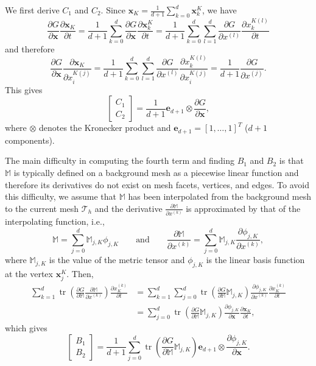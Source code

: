 \documentclass[american]{scrartcl}
\providecommand{\V}[1]{\boldsymbol{#1}}
\providecommand{\p}[2]{\frac{\partial{}#1}{\partial{}#2}}
\providecommand{\Th}{\mathcal{T}_h}
\providecommand{\M}{\mathbb{M}}
\theoremstyle{remark}
\begin{document}
We first derive $C_1$ and $C_2$. 
Since $\V{x}_K = \frac{1}{d+1} \sum\limits_{k=0}^d \V{x}_{k}^K$, we have
\[
   \p{G}{\V{x}} \p{\V{x}_K}{t} 
      = \frac{1}{d+1} \sum_{k=0}^d \p{G}{\V{x}} \p{\V{x}_{k}^K}{t}
      = \frac{1}{d+1} \sum_{k=0}^d \sum_{l=1}^d 
         \p{G}{x^{(l)}} \p{x_{k}^{K (l)}}{t}
\]
and therefore
\[
   \p{G}{\V{x}} \p{\V{x}_K}{x_{i}^{K (j)}}  
      = \frac{1}{d+1} \sum_{k=0}^d \sum_{l=1}^d \p{G}{x^{(l)}}
         \p{x_{k}^{K (l)}}{x_{i}^{K (j)}}
      = \frac{1}{d+1} \p{G}{x^{(j)}}
   .
\]
This gives
\begin{equation}
   \begin{bmatrix} C_1 \\ C_2 \end{bmatrix}  
      =  \frac{1}{d+1} \V{e}_{d+1} \otimes  \p{G}{\V{x}}
   ,
   \label{eq:x:der:4}
\end{equation}
where $\otimes$ denotes the Kronecker product and $\V{e}_{d+1} = {[1,\dotsc,1]}^T$ ($d+1$ components).

The main difficulty in computing the fourth term and finding $B_1$ and $B_2$ is that $\M$ is typically defined on a background mesh as a piecewise linear function and therefore its derivatives do not exist on mesh facets, vertices, and edges.
To avoid this difficulty, we assume that $\M$ has been interpolated from the background mesh to the current mesh $\Th$ and the derivative $\p{\M}{x^{(k)}}$ is approximated by that of the interpolating function, i.e., 
\[
   \M = \sum_{j=0}^d \M_{j,K} \phi_{j, K}
   \qquad \text{and} \qquad
   \p{\M}{x^{(k)}} = \sum_{j=0}^d \M_{j,K} \p{\phi_{j,K}}{x^{(k)}}
   ,
\]
where $\M_{j,K}$ is the value of the metric tensor and $\phi_{j,K}$ is the linear basis function at the vertex $\V{x}_{j}^K$.
Then,
\begin{align*}
   \sum_{k=1}^d \operatorname{tr}\left( \p{G}{\M} \p{\M}{x^{(k)}} \right) \p{x_K^{(k)}}{t}
      &= \sum_{k=1}^d \sum_{j=0}^d \operatorname{tr}\left( \p{G}{\M} \M_{j,K} \right)
      \p{\phi_{j,K}}{x^{(k)}} \p{x_K^{(k)}}{t}
   \\
      &=  \sum_{j=0}^d \operatorname{tr}\left( \p{G}{\M} \M_{j,K} \right)  
         \p{\phi_{j,K}}{\V{x}} \p{\V{x}_K}{t}
   ,
\end{align*}
which gives
\begin{equation}
   \begin{bmatrix} B_1 \\ B_2 \end{bmatrix}  
      =  \frac{1}{d+1} \sum_{j=0}^{d} \operatorname{tr}\left( \p{G}{\M} \M_{j, K} \right)
         \V{e}_{d+1} \otimes  \p{\phi_{j,K}}{\V{x}} .
   \label{eq:x:der:5}
\end{equation}
\end{document}
